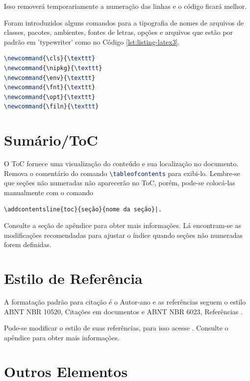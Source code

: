 \documentclass[12pt,a4paper,oneside,linenumbers=off,latinmodern=off,timesnews=off,spanish,english,portuges]{rctart-class/rctart}
\begin{document}
    Isso removerá temporariamente a numeração das linhas e o código ficará melhor.
    
    Foram introduzidos alguns comandos para a tipografia de nomes de arquivos de classes, pacotes, ambientes, fontes de letras, opções e arquivos que estão por padrão em 'typewriter' como no Código \ref{lst:listing-latex3}.
\begin{lstlisting}[language=TeX,caption={Tipografia de nomes de arquivos, ambientes, fontes de letras, etc},label={lst:listing-latex3}]
\newcommand{\cls}{\texttt}
\newcommand{\nipkg}{\texttt}
\newcommand{\env}{\texttt}
\newcommand{\fnt}{\texttt}
\newcommand{\opt}{\texttt}
\newcommand{\filn}{\texttt}
\end{lstlisting}



\section{Sumário/ToC}

    O ToC fornece uma visualização do conteúdo e sua localização no documento. Remova o comentário do comando \lstinline[language=TeX]|\tableofcontents| para exibi-lo. Lembre-se que seções não numeradas não aparecerão no ToC, porém, pode-se colocá-las manualmente com o comando 
\begin{lstlisting}
\addcontentsline{toc}{seção}{nome da seção}|. 
\end{lstlisting}


    Consulte a seção de apêndice para obter mais informações. Lá encontram-se as modificações recomendadas para ajustar o índice quando seções não numeradas forem definidas.

\section{Estilo de Referência}

    A formatação padrão para citação é o Autor-ano e as referências seguem o estilo ABNT NBR 10520, Citações em documentos \cite{NBR10520:2023} e ABNT NBR 6023, Referências \cite{NBR6023:2018}. 
    
    Pode-se modificar o estilo de suas referências, para isso acesse . Consulte o apêndice para obter mais informações.
	


    \section{Outros Elementos}
\end{document}

